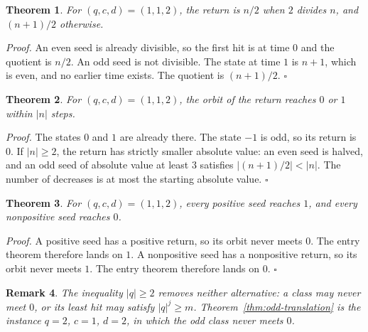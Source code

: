 \documentclass[11pt,letterpaper]{article}
\newtheorem{theorem}{Theorem}
\newtheorem{remark}[theorem]{Remark}
\newenvironment{proof}{\noindent\textit{Proof.}}{\hfill\(\square\)}
\begin{document}
\begin{theorem}
\label{thm:oneonetwo}
For \((q,c,d)=(1,1,2)\), the return is \(n/2\) when \(2\) divides \(n\), and \((n+1)/2\) otherwise.
\end{theorem}

\begin{proof}
An even seed is already divisible, so the first hit is at time \(0\) and the quotient is \(n/2\). An odd seed is not divisible. The state at time \(1\) is \(n+1\), which is even, and no earlier time exists. The quotient is \((n+1)/2\).
\end{proof}

\begin{theorem}
\label{thm:oneonetwoenters}
For \((q,c,d)=(1,1,2)\), the orbit of the return reaches \(0\) or \(1\) within \(\lvert n\rvert\) steps.
\end{theorem}

\begin{proof}
The states \(0\) and \(1\) are already there. The state \(-1\) is odd, so its return is \(0\). If \(\lvert n\rvert\ge 2\), the return has strictly smaller absolute value: an even seed is halved, and an odd seed of absolute value at least \(3\) satisfies \(\lvert (n+1)/2\rvert<\lvert n\rvert\). The number of decreases is at most the starting absolute value.
\end{proof}

\begin{theorem}
\label{thm:oneonetwoterminal}
For \((q,c,d)=(1,1,2)\), every positive seed reaches \(1\), and every nonpositive seed reaches \(0\).
\end{theorem}

\begin{proof}
A positive seed has a positive return, so its orbit never meets \(0\). The entry theorem therefore lands on \(1\). A nonpositive seed has a nonpositive return, so its orbit never meets \(1\). The entry theorem therefore lands on \(0\).
\end{proof}

\begin{remark}
\label{rem:class}
The inequality \(\lvert q\rvert\ge 2\) removes neither alternative: a class may never meet \(0\), or its least hit may satisfy \(\lvert q\rvert^j\ge m\). Theorem~\ref{thm:odd-translation} is the instance \(q=2\), \(c=1\), \(d=2\), in which the odd class never meets \(0\).
\end{remark}
\end{document}
